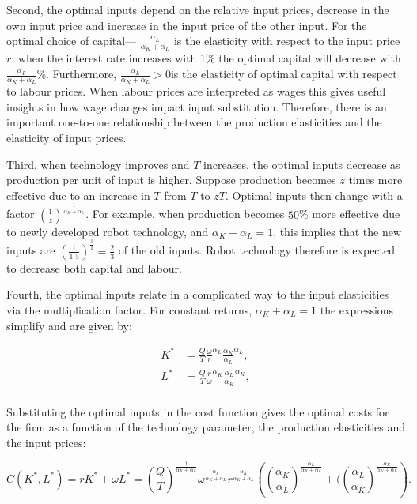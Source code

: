 \documentclass[
]{book}
\begin{document}
Second, the optimal inputs depend on the relative input prices, decrease in the own input price and increase in the input price of the other input. For the optimal choice of capital--- \(\frac{\alpha_L}{\alpha_K+\alpha_L}\) is the elasticity with respect to the input price \(r\): when the interest rate increases with 1\% the optimal capital will decrease with \(\frac{\alpha_L}{\alpha_K+\alpha_L}\)\%. Furthermore, \(\frac{\alpha_L}{\alpha_K+\alpha_L}>0\)is the elasticity of optimal capital with respect to labour prices. When labour prices are interpreted as wages this gives useful insights in how wage changes impact input substitution. Therefore, there is an important one-to-one relationship between the production elasticities and the elasticity of input prices.

Third, when technology improves and \(T\) increases, the optimal inputs decrease as production per unit of input is higher. Suppose production becomes \(z\) times more effective due to an increase in \(T\) from \(T\) to \(zT\). Optimal inputs then change with a factor \(\left(\frac{1}{z}\right)^{\frac{1}{\alpha_K+ \alpha_L}}\). For example, when production becomes \(50\)\% more effective due to newly developed robot technology, and \(\alpha_K+\alpha_L=1\), this implies that the new inputs are \(\left(\frac{1}{1.5}\right)^{\frac{1}{1}} = \frac{2}{3}\) of the old inputs. Robot technology therefore is expected to decrease both capital and labour.

Fourth, the optimal inputs relate in a complicated way to the input elasticities via the multiplication factor. For constant returns, \(\alpha_K+\alpha_L = 1\) the expressions simplify and are given by:

\begin{align}
K^\ast &= \frac{Q}{T}\frac{\omega}{r}^{\alpha_L}\frac{\alpha_K}{\alpha_L}^{\alpha_L},\\
L^\ast &= \frac{Q}{T}\frac{r}{\omega}^{\alpha_K}\frac{\alpha_L}{\alpha_K}^{\alpha_K},\\
\end{align}

Substituting the optimal inputs in the cost function gives the optimal costs for the firm as a function of the technology parameter, the production elasticities and the input prices:

\begin{equation}
C(K^\ast, L^\ast) = rK^\ast + \omega L^\ast = \left(\frac{Q}{T}\right)^{\frac{1}{\alpha_K + \alpha_L}} \omega^{\frac{\alpha_L}{\alpha_K + \alpha_L}} r^{\frac{\alpha_K}{\alpha_K + \alpha_L}}\left(\left(\frac{\alpha_K}{\alpha_L}\right)^{\frac{\alpha_L}{\alpha_K + \alpha_L}} + (\left(\frac{\alpha_L}{\alpha_K}\right)^{\frac{\alpha_K}{\alpha_K + \alpha_L}} \right). 
\end{equation}
\end{document}
